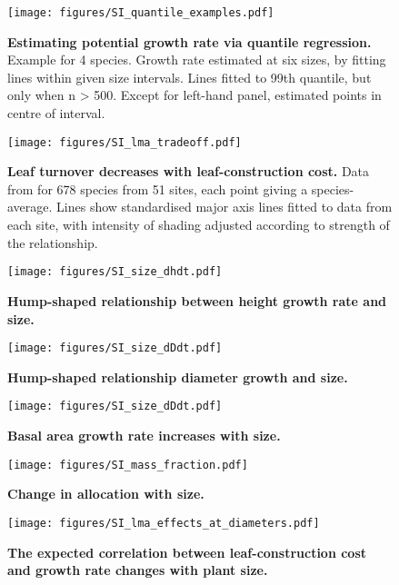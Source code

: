 \documentclass[12pt, a4paper]{article}
\makeatletter
\def\maxwidth{\ifdim\Gin@nat@width>\linewidth\linewidth
\else\Gin@nat@width\fi}
\let\Oldincludegraphics\includegraphics
\renewcommand{\includegraphics}[1]{\Oldincludegraphics[width=\maxwidth]{#1}}
\makeatother
\begin{document}
\begin{appendices}
\begin{figure}[htbp]
\centering
\texttt{[image: figures/SI\_quantile\_examples.pdf]}
\caption{\textbf{Estimating potential growth rate via quantile
regression.} Example for 4 species. Growth rate estimated at six sizes,
by fitting lines within given size intervals. Lines fitted to 99th
quantile, but only when n \textgreater{} 500. Except for left-hand
panel, estimated points in centre of interval.
\label{fS-quantile_examples}}
\end{figure}

\begin{figure}[htbp]
\centering
\texttt{[image: figures/SI\_lma\_tradeoff.pdf]}
\caption{\textbf{Leaf turnover decreases with leaf-construction cost.}
Data from \citep{wright_world-2004} for 678 species from 51 sites, each
point giving a species-average. Lines show standardised major axis lines
fitted to data from each site, with intensity of shading adjusted
according to strength of the relationship.\label{fS-leaf}}
\end{figure}

\newpage

\begin{figure}[htbp]
\centering
\texttt{[image: figures/SI\_size\_dhdt.pdf]}
\caption{\textbf{Hump-shaped relationship between height growth rate and
size.} \label{f-hump}}
\end{figure}

\newpage

\begin{figure}[htbp]
\centering
\texttt{[image: figures/SI\_size\_dDdt.pdf]}
\caption{\textbf{Hump-shaped relationship diameter growth and size.}
\label{f-SI_size_dDdt}}
\end{figure}

\begin{figure}[htbp]
\centering
\texttt{[image: figures/SI\_size\_dDdt.pdf]}
\caption{\textbf{Basal area growth rate increases with size.}
\label{f-SI_size_dastdt}}
\end{figure}

\newpage

\begin{figure}[htbp]
\centering
\texttt{[image: figures/SI\_mass\_fraction.pdf]}
\caption{\textbf{Change in allocation with size.}
\label{f-mass_fraction}}
\end{figure}

\newpage

\begin{figure}[htbp]
\centering
\texttt{[image: figures/SI\_lma\_effects\_at\_diameters.pdf]}
\caption{\textbf{The expected correlation between leaf-construction cost
and growth rate changes with plant size.} \label{f-lma_growth_size}}
\end{figure}


\end{appendices}
\end{document}
